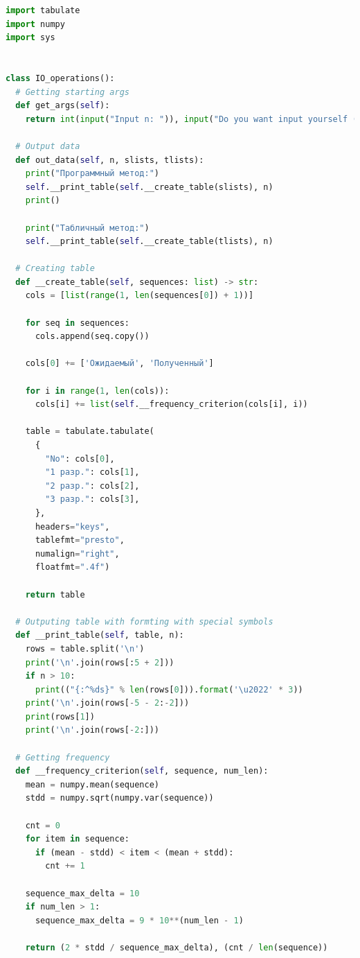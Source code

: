 \documentclass[a4paper, 12pt]{article}
\begin{document}
\begin{lstlisting}[language=Python, caption = Работа с вводом и выводом в терминале (io_operaions.py)]
import tabulate
import numpy
import sys


class IO_operations():
  # Getting starting args
  def get_args(self):
    return int(input("Input n: ")), input("Do you want input yourself (y/n) ?")

  # Output data
  def out_data(self, n, slists, tlists):
    print("Программный метод:")
    self.__print_table(self.__create_table(slists), n)
    print()

    print("Табличный метод:")
    self.__print_table(self.__create_table(tlists), n)

  # Creating table
  def __create_table(self, sequences: list) -> str:
    cols = [list(range(1, len(sequences[0]) + 1))]

    for seq in sequences:
      cols.append(seq.copy())

    cols[0] += ['Ожидаемый', 'Полученный']

    for i in range(1, len(cols)):
      cols[i] += list(self.__frequency_criterion(cols[i], i))

    table = tabulate.tabulate(
      {
        "No": cols[0],
        "1 разр.": cols[1],
        "2 разр.": cols[2],
        "3 разр.": cols[3],
      },
      headers="keys",
      tablefmt="presto",
      numalign="right",
      floatfmt=".4f")

    return table

  # Outputing table with formting with special symbols
  def __print_table(self, table, n):
    rows = table.split('\n')
    print('\n'.join(rows[:5 + 2]))
    if n > 10:
      print(("{:^%ds}" % len(rows[0])).format('\u2022' * 3))
    print('\n'.join(rows[-5 - 2:-2]))
    print(rows[1])
    print('\n'.join(rows[-2:]))

  # Getting frequency 
  def __frequency_criterion(self, sequence, num_len):
    mean = numpy.mean(sequence)
    stdd = numpy.sqrt(numpy.var(sequence))

    cnt = 0
    for item in sequence:
      if (mean - stdd) < item < (mean + stdd):
        cnt += 1

    sequence_max_delta = 10
    if num_len > 1:
      sequence_max_delta = 9 * 10**(num_len - 1)

    return (2 * stdd / sequence_max_delta), (cnt / len(sequence))
\end{lstlisting}
\end{document}
